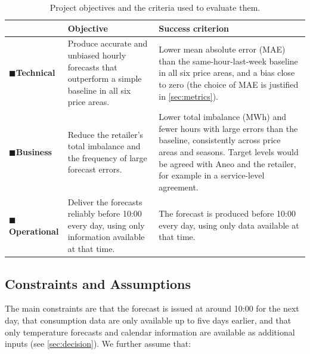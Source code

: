 \documentclass[11pt,a4paper]{article}
\begin{document}
\begin{table}[H]
\centering
\small
\renewcommand{\arraystretch}{1.2}
\begin{tabularx}{\textwidth}{@{}>{\raggedright\arraybackslash}p{2.35cm}>{\raggedright\arraybackslash}p{5.0cm}>{\raggedright\arraybackslash}X@{}}
\toprule
 & \textbf{Objective} & \textbf{Success criterion} \\
\midrule
\textcolor{cblue}{$\blacksquare$}\enspace\textbf{\textcolor{cblue!75!black}{Technical}} &
Produce accurate and unbiased hourly forecasts that outperform a simple baseline in all six price areas. &
Lower mean absolute error (MAE) than the same-hour-last-week baseline in all six price areas, and a bias close to zero (the choice of MAE is justified in \cref{sec:metrics}). \\[6pt]
\textcolor{cgreen}{$\blacksquare$}\enspace\textbf{\textcolor{cgreen!60!black}{Business}} &
Reduce the retailer's total imbalance and the frequency of large forecast errors. &
Lower total imbalance (MWh) and fewer hours with large errors than the baseline, consistently across price areas and seasons. Target levels would be agreed with Aneo and the retailer, for example in a service-level agreement. \\[6pt]
\textcolor{corange}{$\blacksquare$}\enspace\textbf{\textcolor{corange!75!black}{Operational}} &
Deliver the forecasts reliably before 10:00 every day, using only information available at that time. &
The forecast is produced before 10:00 every day, using only data available at that time. \\
\bottomrule
\end{tabularx}
\caption{Project objectives and the criteria used to evaluate them.}
\label{tab:objectives}
\end{table}

\subsection{Constraints and Assumptions}
\label{sec:assumptions}

The main constraints are that the forecast is issued at around 10:00 for the next day, that consumption data are only available up to five days earlier, and that only temperature forecasts and calendar information are available as additional inputs (see \cref{sec:decision}). We further assume that:
\end{document}
